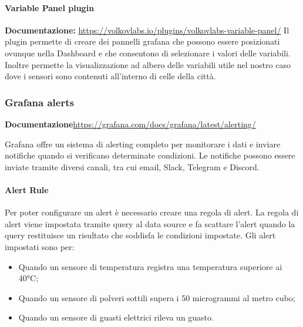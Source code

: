 \paragraph{Variable Panel plugin}
\textbf{Documentazione:} \href{https://volkovlabs.io/plugins/volkovlabs-variable-panel/}{https://volkovlabs.io/plugins/volkovlabs-variable-panel/}
Il plugin permette di creare dei pannelli grafana che possono essere posizionati ovunque nella Dashboard e che consentono di selezionare i valori delle variabili.
Inoltre permette la visualizzazione ad albero delle variabili utile nel nostro caso dove i sensori sono contenuti all'interno di celle della città.

\subsubsection{Grafana alerts}
\textbf{Documentazione}\href{https://grafana.com/docs/grafana/latest/alerting/}{https://grafana.com/docs/grafana/latest/alerting/}


Grafana offre un sistema di alerting completo per monitorare i dati e inviare notifiche quando si verificano determinate condizioni. Le notifiche possono essere inviate tramite diversi canali, tra cui email, Slack, Telegram e Discord.

\paragraph{Alert Rule}
Per poter configurare un alert è necessario creare una regola di alert. La regola di alert viene impostata tramite query al data source e fa scattare l'alert quando la query restituisce un risultato che soddisfa le condizioni impostate.
Gli alert impostati sono per:
\begin{itemize}
    \item Quando un sensore di temperatura registra una temperatura superiore ai 40°C;
    \item Quando un sensore di polveri sottili supera i 50 microgrammi al metro cubo;
    \item Quando un sensore di guasti elettrici rileva un guasto.
\end{itemize}

